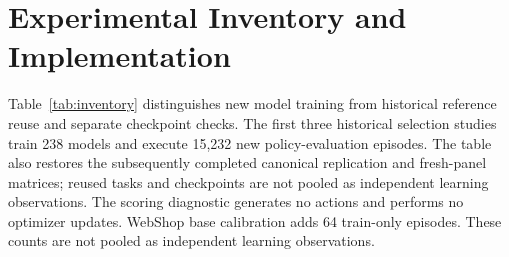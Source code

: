 \section{Experimental Inventory and Implementation}
\label{app:inventory}
Table~\ref{tab:inventory} distinguishes new model training from historical reference reuse and separate checkpoint checks. The first three historical selection studies train 238 models and execute 15,232 new policy-evaluation episodes. The table also restores the subsequently completed canonical replication and fresh-panel matrices; reused tasks and checkpoints are not pooled as independent learning observations. The scoring diagnostic generates no actions and performs no optimizer updates. WebShop base calibration adds 64 train-only episodes. These counts are not pooled as independent learning observations.

\begin{table}[h]
\centering
\caption{Completed study inventory. Additional references and conditional repeats are excluded from primary selection means.}
\label{tab:inventory}
\small
{}
\end{table}

